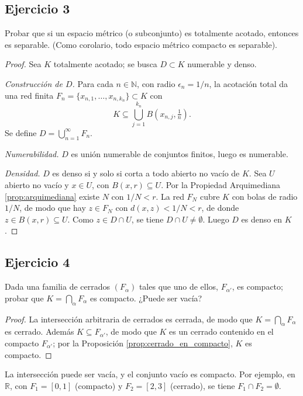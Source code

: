 \documentclass[11pt, a4paper]{article}
\begin{document}
\subsection*{Ejercicio 3}

Probar que si un espacio métrico (o subconjunto) es totalmente acotado, entonces es separable.
(Como corolario, todo espacio métrico compacto es separable).

\begin{proof}
Sea $K$ totalmente acotado; se busca $D \subset K$ numerable y denso.

\textit{Construcción de $D$.} Para cada $n \in \mathbb{N}$, con radio $\epsilon_n = 1/n$, la
acotación total da una red finita $F_n = \{x_{n,1}, \dots, x_{n,k_n}\} \subset K$ con
$$ K \subseteq \bigcup_{j=1}^{k_n} B\!\left(x_{n,j}, \tfrac{1}{n}\right). $$
Se define $D = \bigcup_{n=1}^{\infty} F_n$.

\textit{Numerabilidad.} $D$ es unión numerable de conjuntos finitos, luego es numerable.

\textit{Densidad.} $D$ es denso si y solo si corta a todo abierto no vacío de $K$. Sea $U$ abierto no
vacío y $x \in U$, con $B(x, r) \subseteq U$. Por la Propiedad Arquimediana \ref{prop:arquimediana}
existe $N$ con $1/N < r$.
La red $F_N$ cubre $K$ con bolas de radio $1/N$, de modo que hay $z \in F_N$ con $d(x, z) < 1/N < r$, de
donde $z \in B(x, r) \subseteq U$. Como $z \in D \cap U$, se tiene $D \cap U \neq \emptyset$. Luego
$D$ es denso en $K$.
\end{proof}

\subsection*{Ejercicio 4}

Dada una familia de cerrados $(F_{\alpha})$ tales que uno de ellos, $F_{\alpha'}$, es compacto;
probar que $K = \bigcap_{\alpha} F_{\alpha}$ es compacto. ¿Puede ser vacía?

\begin{proof}
La intersección arbitraria de cerrados es cerrada, de modo que $K = \bigcap_\alpha F_\alpha$ es cerrado.
Además $K \subseteq F_{\alpha'}$, de modo que $K$ es un cerrado contenido en el compacto
$F_{\alpha'}$; por la Proposición \ref{prop:cerrado_en_compacto}, $K$ es compacto.
\end{proof}

La intersección puede ser vacía, y el conjunto vacío es compacto. Por ejemplo, en $\mathbb{R}$, con
$F_1 = [0, 1]$ (compacto) y $F_2 = [2, 3]$ (cerrado), se tiene $F_1 \cap F_2 = \emptyset$.
\end{document}

